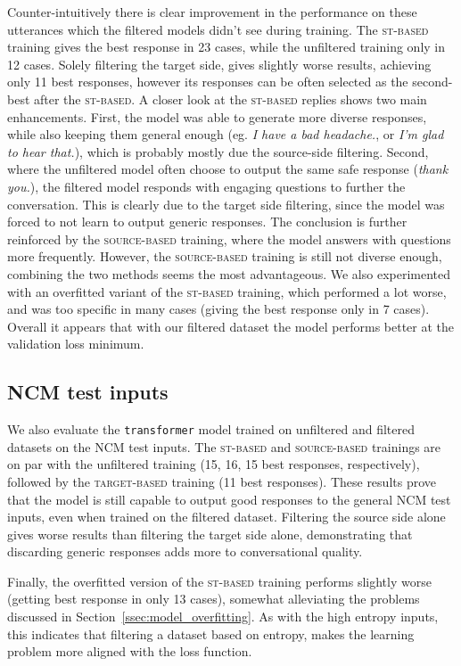 \documentclass[11pt,a4paper]{article}
\begin{document}
Counter-intuitively there is clear improvement in the performance on these utterances which the filtered models didn't see during training.
The \textsc{st-based} training gives the best response in 23 cases, while the unfiltered training only in 12 cases. Solely filtering the target side, gives slightly worse results, achieving only 11 best responses, however its responses can be often selected as the second-best after the \textsc{st-based}. A closer look at the \textsc{st-based} replies shows two main enhancements. First, the model was able to generate more diverse
responses, while also keeping them general enough (eg. \textit{I have a bad
	headache.}, or \textit{I'm glad to hear that.}), which is probably mostly due
the source-side filtering. Second, where the unfiltered model often choose to
output the same safe response (\textit{thank you.}), the
filtered model responds with engaging questions to
further the conversation. This is clearly due to the target side filtering,
since the model was forced to not learn to output generic responses. The conclusion is further reinforced by the \textsc{source-based} training, where the model answers with questions more frequently. However, the \textsc{source-based} training is still not diverse enough, combining the two methods seems the most advantageous. We also experimented with an overfitted variant of the \textsc{st-based} training, which performed a lot worse, and was too specific in many cases (giving the best response only in 7 cases). Overall it appears that with our filtered dataset the model performs better at the validation loss minimum.

\subsection{NCM test inputs}
\label{ssec:ncm_test_inputs}
We also evaluate the \texttt{transformer} model trained on unfiltered and filtered datasets on the NCM test inputs. The \textsc{st-based} and \textsc{source-based}
trainings are on par with the unfiltered training (15, 16, 15 best responses, respectively), followed by the \textsc{target-based} training (11 best responses). These results prove that the model is still capable to
output good responses to the general NCM test inputs, even when trained on the
filtered dataset. Filtering the source side alone gives worse results than filtering the target side alone, demonstrating that discarding generic responses adds more to conversational quality.

Finally, the overfitted version of the \textsc{st-based} training
performs slightly worse (getting best response in only 13 cases), somewhat alleviating the problems discussed in Section~\ref{ssec:model_overfitting}. As with the high entropy inputs, this indicates that filtering a dataset based on entropy, makes the learning problem more
aligned with the loss function.
\end{document}

